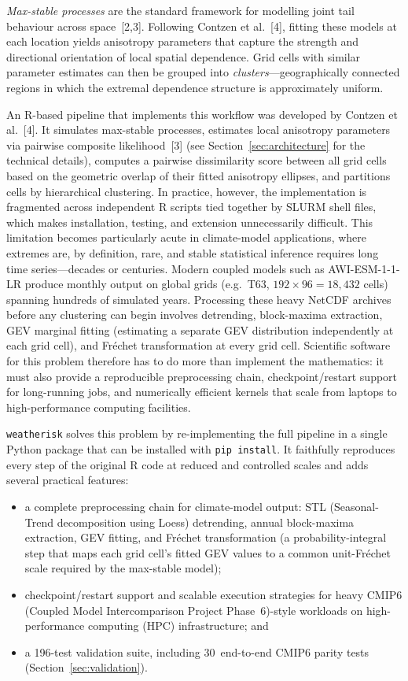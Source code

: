 \documentclass[preprint,12pt,a4paper]{elsarticle}
\newcommand{\rev}[1]{{#1}}
\newcommand{\revo}[1]{{#1}}
\newcommand{\revr}[1]{{#1}}
\begin{document}
\emph{Max-stable processes} are the standard framework for
modelling joint tail behaviour across space~[2,3].
Following Contzen et al.~[4], fitting these models at each location
yields anisotropy parameters that capture the strength and
directional orientation of local spatial dependence.
Grid cells with similar parameter estimates can then be grouped
into \emph{clusters}---geographically connected regions in which
the extremal dependence structure is approximately uniform.

An R-based pipeline that implements this workflow was developed
by Contzen et al.~[4]. It simulates max-stable processes,
estimates local anisotropy parameters via pairwise composite
likelihood~[3] \revr{(see Section~\ref{sec:architecture} for the
technical details)}, computes a pairwise dissimilarity score between
all grid cells based on the geometric overlap of their fitted
anisotropy ellipses, and partitions cells by hierarchical clustering. In practice,
however, the implementation is fragmented across independent
R scripts tied together by SLURM shell files, which makes
installation, testing, and extension unnecessarily difficult.
\rev{This limitation becomes particularly acute in climate-model
applications, where extremes are, by definition, rare, and stable
statistical inference requires long time series---decades or
centuries. Modern coupled models such as AWI-ESM-1-1-LR produce
monthly output on global grids (e.g.\ T63, $192 \times 96 = 18{,}432$ cells) spanning hundreds of simulated years.  Processing
these heavy NetCDF archives before any clustering can begin involves
detrending, block-maxima extraction, GEV marginal fitting (estimating
a separate GEV distribution independently at each grid cell), and
Fr\'{e}chet transformation at every grid cell.  Scientific software
for this problem therefore has to do more than implement the
mathematics: it must also provide a reproducible preprocessing chain,
checkpoint/restart support for long-running jobs, and numerically
efficient kernels that scale from laptops to high-performance
computing facilities.}

\texttt{weatherisk} solves this problem by re-implementing the full
pipeline in a single Python package that can be installed with
\texttt{pip install}.  It faithfully reproduces every step of the
original R code at reduced and controlled scales and adds several
practical features:
\begin{itemize}
\item \rev{a complete preprocessing chain for climate-model output:
  STL (Seasonal-Trend decomposition using Loess) detrending, annual
  block-maxima extraction, GEV fitting, and Fr\'{e}chet transformation
  (a probability-integral step that maps each grid cell's fitted GEV
  values to a common unit-Fr\'{e}chet scale required by the max-stable
  model)};
\item \rev{checkpoint/restart support and scalable execution
  strategies for heavy CMIP6\revo{ (Coupled Model Intercomparison
  Project Phase~6)}-style workloads on high-performance
  computing (HPC) infrastructure}; and
\item \rev{a 196-test validation suite, including 30~end-to-end
  CMIP6 parity tests (Section~\ref{sec:validation})}.
\end{itemize}
\end{document}
